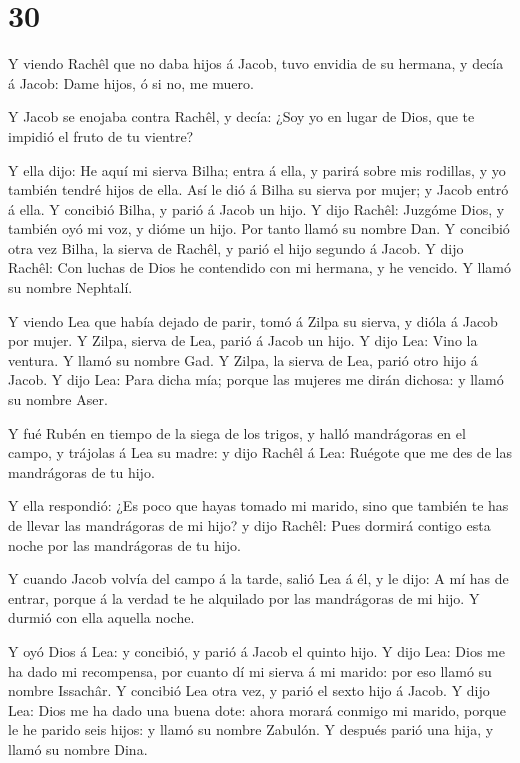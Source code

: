 \hypertarget{section-29}{%
\section{30}\label{section-29}}

 Y viendo Rachêl que no daba hijos á Jacob, tuvo envidia de
su hermana, y decía á Jacob: Dame hijos, ó si no, me muero.

 Y Jacob se enojaba contra Rachêl, y decía: ¿Soy yo en lugar
de Dios, que te impidió el fruto de tu vientre?

 Y ella dijo: He aquí mi sierva Bilha; entra á ella, y
parirá sobre mis rodillas, y yo también tendré hijos de ella.
 Así le dió á Bilha su sierva por mujer; y Jacob entró á
ella.  Y concibió Bilha, y parió á Jacob un hijo.
 Y dijo Rachêl: Juzgóme Dios, y también oyó mi voz, y dióme
un hijo. Por tanto llamó su nombre Dan.  Y concibió otra vez
Bilha, la sierva de Rachêl, y parió el hijo segundo á Jacob.
 Y dijo Rachêl: Con luchas de Dios he contendido con mi
hermana, y he vencido. Y llamó su nombre Nephtalí.

 Y viendo Lea que había dejado de parir, tomó á Zilpa su
sierva, y dióla á Jacob por mujer.  Y Zilpa, sierva de Lea,
parió á Jacob un hijo.  Y dijo Lea: Vino la ventura. Y
llamó su nombre Gad.  Y Zilpa, la sierva de Lea, parió otro
hijo á Jacob.  Y dijo Lea: Para dicha mía; porque las
mujeres me dirán dichosa: y llamó su nombre Aser.

 Y fué Rubén en tiempo de la siega de los trigos, y halló
mandrágoras en el campo, y trájolas á Lea su madre: y dijo Rachêl á Lea:
Ruégote que me des de las mandrágoras de tu hijo.

 Y ella respondió: ¿Es poco que hayas tomado mi marido,
sino que también te has de llevar las mandrágoras de mi hijo? y dijo
Rachêl: Pues dormirá contigo esta noche por las mandrágoras de tu hijo.

 Y cuando Jacob volvía del campo á la tarde, salió Lea á
él, y le dijo: A mí has de entrar, porque á la verdad te he alquilado
por las mandrágoras de mi hijo. Y durmió con ella aquella noche.

 Y oyó Dios á Lea: y concibió, y parió á Jacob el quinto
hijo.  Y dijo Lea: Dios me ha dado mi recompensa, por
cuanto dí mi sierva á mi marido: por eso llamó su nombre Issachâr.
 Y concibió Lea otra vez, y parió el sexto hijo á Jacob.
 Y dijo Lea: Dios me ha dado una buena dote: ahora morará
conmigo mi marido, porque le he parido seis hijos: y llamó su nombre
Zabulón.  Y después parió una hija, y llamó su nombre Dina.

